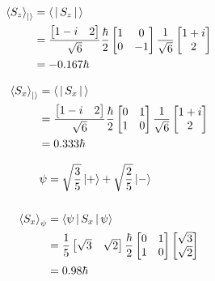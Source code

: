 \documentclass[12pt]{article}
\begin{document}
\newpage
    \problemsub
    \begin{align*}
        \Braket{S_z}_{\Ket{}} &= \Braket{|S_z|} \\
                               &= 
            \frac{\begin{bmatrix} 1 - i & 2 \end{bmatrix}}{\sqrt{6}}
            \frac{\hbar}{2}
            \begin{bmatrix}
                1 & 0 \\
                0 & -1
            \end{bmatrix}
            \frac{1}{\sqrt{6}}
            \begin{bmatrix} 1 + i \\ 2 \end{bmatrix} \\
                &= -0.167\hbar
    \end{align*}


    \problemsub
    \begin{align*}
        \Braket{S_x}_{\Ket{}} &= \Braket{|S_x|} \\
                               &= 
            \frac{\begin{bmatrix} 1 - i & 2 \end{bmatrix}}{\sqrt{6}}
            \frac{\hbar}{2}
            \begin{bmatrix}
                0 & 1 \\
                1 & 0
            \end{bmatrix}
            \frac{1}{\sqrt{6}}
            \begin{bmatrix} 1 + i \\ 2 \end{bmatrix} \\
                &= 0.333\hbar
    \end{align*}



\problem
\begin{align*}
    \psi &= \sqrt{\frac{3}{5}} \Ket{+} + \sqrt{\frac{2}{5}} \Ket{-} \\ \\
    \Braket{S_x}_{\psi} &= \Braket{\psi|S_x|\psi} \\
                        &= \frac{1}{5}
\begin{bmatrix} \sqrt{3} & \sqrt{2} \end{bmatrix}
            \frac{\hbar}{2}
            \begin{bmatrix}
                0 & 1 \\
                1 & 0 
            \end{bmatrix}
        \begin{bmatrix} \sqrt{3} \\ \sqrt{2} \end{bmatrix} \\
            &= 0.98 \hbar
\end{align*}
\end{document}
